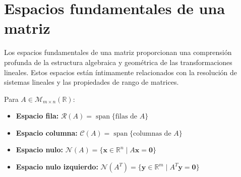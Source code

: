 \section{Espacios fundamentales de una matriz}

Los espacios fundamentales de una matriz proporcionan una comprensión profunda de la estructura algebraica y geométrica de las transformaciones lineales. Estos espacios están íntimamente relacionados con la resolución de sistemas lineales y las propiedades de rango de matrices.

\begin{definition}
Para $A \in \mathcal{M}_{m \times n}(\mathbb{R})$:
\begin{itemize}
    \item \textbf{Espacio fila:} $\mathcal{R}(A) = \operatorname{span}\{\text{filas de } A\}$
    \item \textbf{Espacio columna:} $\mathcal{C}(A) = \operatorname{span}\{\text{columnas de } A\}$
    \item \textbf{Espacio nulo:} $\mathcal{N}(A) = \{ \mathbf{x} \in \mathbb{R}^n \mid A\mathbf{x} = \mathbf{0} \}$
    \item \textbf{Espacio nulo izquierdo:} $\mathcal{N}(A^T) = \{ \mathbf{y} \in \mathbb{R}^m \mid A^T\mathbf{y} = \mathbf{0} \}$
\end{itemize}
\end{definition}

